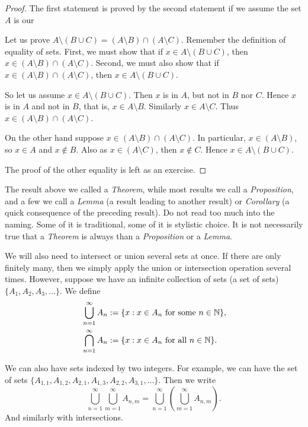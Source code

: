\begin{proof}
The first statement is proved by the second statement if we
assume the set $A$ is our 

Let us prove $A \setminus (B \cup C) = (A \setminus B) \cap (A \setminus C)$.
Remember the definition of equality of sets.  First, we must show that
if $x \in A \setminus (B \cup C)$, then
$x \in (A \setminus B) \cap (A \setminus C)$.  Second, we must also show that
if $x \in (A \setminus B) \cap (A \setminus C)$, then
$x \in A \setminus (B \cup C)$.

So let us assume $x \in A \setminus (B \cup C)$.  Then $x$ is in 
$A$, but not in $B$ nor $C$.  Hence $x$ is in $A$ and not in $B$, that is,
$x \in A \setminus B$.  Similarly $x \in A \setminus C$.  Thus
$x \in (A \setminus B) \cap (A \setminus C)$.

On the other hand suppose 
$x \in (A \setminus B) \cap (A \setminus C)$.  In particular,
$x \in (A \setminus B)$, so 
$x \in A$ and $x \notin B$.  Also as $x \in (A \setminus C)$, then $x \notin C$.
Hence $x \in A \setminus (B \cup C)$.

The proof of the other equality is left as an exercise.
\end{proof}

The result above we called a \emph{Theorem}, while most results we call
a \emph{Proposition}, and a few we call a \emph{Lemma} (a result leading to another result) or
\emph{Corollary} (a quick consequence of the preceding result).
Do not read too much into
the naming.  Some of it is traditional, some of it is stylistic choice.
It is not necessarily true that a \emph{Theorem} is always
 than a
\emph{Proposition} or a \emph{Lemma}.

We will also need to intersect or union several sets at once.  If there are
only finitely many, then we simply apply the union or intersection operation
several times.  However, suppose we have an infinite collection
of sets (a set of sets)
$\{ A_1, A_2, A_3, \ldots \}$.  We define
\begin{align*}
& \bigcup_{n=1}^\infty A_n := \{ x : x \in A_n \text{ for some } n \in {\mathbb{N}}
\} , \\
& \bigcap_{n=1}^\infty A_n := \{ x : x \in A_n \text{ for all } n \in {\mathbb{N}}
\} .
\end{align*}

We can also have sets indexed by two integers.  For example, we can have
the set of sets
$\{ A_{1,1}, A_{1,2}, A_{2,1}, A_{1,3}, A_{2,2}, A_{3,1}, \ldots \}$.  Then
we write 
\begin{equation*}
\bigcup_{n=1}^\infty \bigcup_{m=1}^\infty A_{n,m}
=
\bigcup_{n=1}^\infty \left( \bigcup_{m=1}^\infty A_{n,m} \right) .
\end{equation*}
And similarly with intersections.

